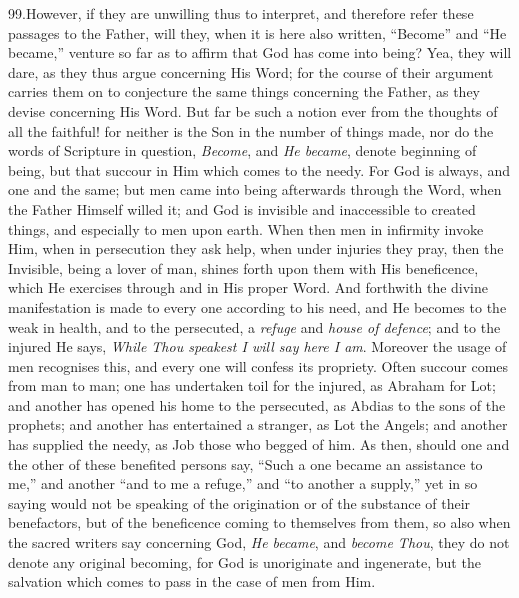 99.\emph{}However, if they
are unwilling thus to interpret, and therefore refer these passages to
the Father, will they, when it is here also written, ``Become'' and ``He
became,'' venture so far as to affirm that God has come into being?
Yea, they will dare, as they thus argue concerning His Word; for the
course of their argument carries them on to conjecture the same things
concerning the Father, as they devise concerning His Word. But far be
such a notion ever from the thoughts of all the faithful! for neither
is the Son in the number of things made, nor do the words of
Scripture in question, \emph{Become}, and \emph{He became}, denote
beginning of being, but that succour in Him which comes to the needy.
For God is always, and one and the same; but men came into being
afterwards through the Word, when the Father Himself willed it; and
God is invisible and inaccessible to created things, and especially to
men upon earth. When then men in infirmity invoke Him, when in
persecution they ask help, when under injuries they pray, then the
Invisible, being a lover of man, shines forth upon them with His
beneficence, which He exercises through and in His proper Word. And
forthwith the divine manifestation is made to every one according to
his need, and He becomes to the weak in health, and to the persecuted,
a \emph{refuge} and \emph{house of defence}; and to the injured He
says, \emph{While Thou speakest I will say here I am}. Moreover the
usage of men recognises this, and every one will confess its
propriety. Often succour comes from man to man; one has undertaken
toil for the injured, as Abraham for Lot; and another has opened his
home to the persecuted, as Abdias to the sons of the prophets; and
another has entertained a stranger, as Lot the Angels; and another has
supplied the needy, as Job those who begged of him. As then, should
one and the other of these benefited persons say, ``Such a one became
an assistance to me,'' and another ``and to me a refuge,'' and ``to
another a supply,'' yet in so saying would not be speaking of the
origination or of the substance of their benefactors, but of the
beneficence coming to themselves from them, so also when the sacred
writers say concerning God, \emph{He became}, and \emph{become Thou},
they do not denote any original becoming, for God is unoriginate and
ingenerate, but the salvation which comes to pass in the case of men
from Him.

